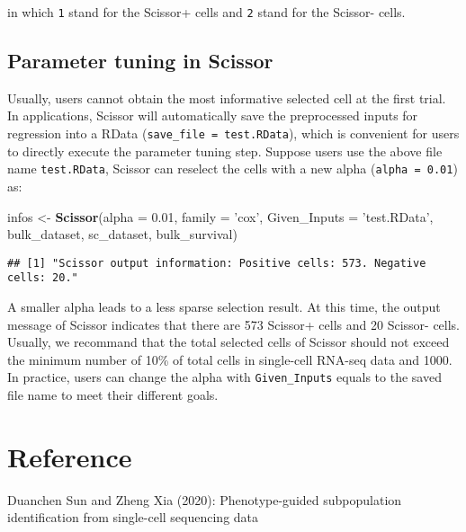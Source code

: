 \documentclass[]{article}
\newenvironment{Shaded}{\begin{snugshade}}{\end{snugshade}}
\newcommand{\KeywordTok}[1]{\textcolor[rgb]{0.13,0.29,0.53}{\textbf{#1}}}
\newcommand{\DataTypeTok}[1]{\textcolor[rgb]{0.13,0.29,0.53}{#1}}
\newcommand{\FloatTok}[1]{\textcolor[rgb]{0.00,0.00,0.81}{#1}}
\newcommand{\StringTok}[1]{\textcolor[rgb]{0.31,0.60,0.02}{#1}}
\newcommand{\NormalTok}[1]{#1}
\begin{document}
in which \texttt{1} stand for the Scissor+ cells and \texttt{2} stand
for the Scissor- cells.

\subsection{Parameter tuning in
Scissor}\label{parameter-tuning-in-scissor}

Usually, users cannot obtain the most informative selected cell at the
first trial. In applications, Scissor will automatically save the
preprocessed inputs for regression into a RData
(\texttt{save\_file\ =\ \textquotesingle{}test.RData}), which is
convenient for users to directly execute the parameter tuning step.
Suppose users use the above file name \texttt{test.RData}, Scissor can
reselect the cells with a new alpha (\texttt{alpha\ =\ 0.01}) as:

\begin{Shaded}
\begin{Highlighting}[]
\NormalTok{infos <-}\StringTok{ }\KeywordTok{Scissor}\NormalTok{(}\DataTypeTok{alpha =} \FloatTok{0.01}\NormalTok{, }\DataTypeTok{family =} \StringTok{'cox'}\NormalTok{, }\DataTypeTok{Given_Inputs =} \StringTok{'test.RData'}\NormalTok{,}
\NormalTok{                 bulk_dataset, sc_dataset, bulk_survival)}
\end{Highlighting}
\end{Shaded}

\begin{verbatim}
## [1] "Scissor output information: Positive cells: 573. Negative cells: 20."
\end{verbatim}

A smaller alpha leads to a less sparse selection result. At this time,
the output message of Scissor indicates that there are 573 Scissor+
cells and 20 Scissor- cells. Usually, we recommand that the total
selected cells of Scissor should not exceed the minimum number of 10\%
of total cells in single-cell RNA-seq data and 1000. In practice, users
can change the alpha with \texttt{Given\_Inputs} equals to the saved
file name to meet their different goals.

\section{Reference}\label{reference}

Duanchen Sun and Zheng Xia (2020): Phenotype-guided subpopulation
identification from single-cell sequencing data
\end{document}
